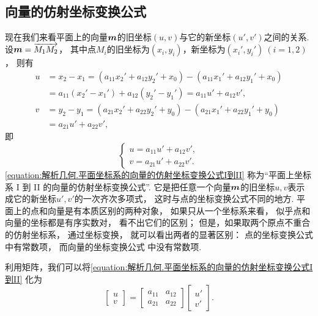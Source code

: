\subsection{向量的仿射坐标变换公式}
现在我们来看平面上的向量\(\boldsymbol{m}\)的旧坐标\((u,v)\)与它的新坐标\((u',v')\)之间的关系.
设\(\boldsymbol{m}=\overrightarrow{M_1 M_2}\)，
其中点\(M_i\)的旧坐标为\((x_i,y_i)\)，新坐标为\((x_i',y_i')\ (i=1,2)\)，
则有\begin{align*}
	u &= x_2 - x_1
	= (a_{11} x_2' + a_{12} y_2' + x_0)
	- (a_{11} x_1' + a_{12} y_1' + x_0) \\
	&= a_{11} (x_2' - x_1')
	+ a_{12} (y_2' - y_1')
	= a_{11} u' + a_{12} v', \\
	v &= y_2 - y_1
	= (a_{21} x_2' + a_{22} y_2' + y_0)
	- (a_{21} x_1' + a_{22} y_1' + y_0) \\
	&= a_{21} u' + a_{22} v',
\end{align*}
即\begin{equation}\label{equation:解析几何.平面坐标系的向量的仿射坐标变换公式I到II}
	\left\{ \begin{array}{l}
		u = a_{11} u' + a_{12} v', \\
		v = a_{21} u' + a_{22} v'.
	\end{array} \right.
\end{equation}
\cref{equation:解析几何.平面坐标系的向量的仿射坐标变换公式I到II}
称为“平面上坐标系 I 到 II 的向量的仿射坐标变换公式”.
它是把任意一个向量\(\boldsymbol{m}\)的旧坐标\(u,v\)表示成它的新坐标\(u',v'\)的一次齐次多项式，
这时与点的坐标变换公式不同的地方.
平面上的点和向量是有本质区别的两种对象，
如果只从一个坐标系来看，
似乎点和向量的坐标都是有序实数对，
看不出它们的区别；
但是，如果取两个原点不重合的仿射坐标系，
通过坐标变换，
就可以看出两者的显著区别：
点的坐标变换公式  中有常数项，
而向量的坐标变换公式  中没有常数项.

利用矩阵，我们可以将\cref{equation:解析几何.平面坐标系的向量的仿射坐标变换公式I到II}
化为\begin{equation}\label{equation:解析几何.平面坐标系的向量的仿射坐标变换公式I到II.矩阵形式1}
	\begin{bmatrix}
		u \\ v
	\end{bmatrix}
	= \begin{bmatrix}
		a_{11} & a_{12} \\
		a_{21} & a_{22}
	\end{bmatrix} \begin{bmatrix}
		u' \\ v'
	\end{bmatrix}.
\end{equation}

